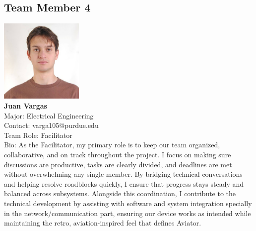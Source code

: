 \subsection{Team Member 4}
\includegraphics[height=4cm]{images/juan.png} \\
\textbf{Juan Vargas}\\
Major: Electrical Engineering\\
Contact: varga105@purdue.edu\\
Team Role: Facilitator \\
Bio: As the Facilitator, my primary role is to keep our team
organized, collaborative, and on track throughout the project.
I focus on making sure discussions are productive, tasks are
clearly divided, and deadlines are met without overwhelming
any single member. By bridging technical conversations and
helping resolve roadblocks quickly, I ensure that progress
stays steady and balanced across subsystems. Alongside this
coordination, I contribute to the technical development by
assisting with software and system integration specially in
the network/communication part, ensuring our device works as
intended while maintaining the retro, aviation-inspired feel
that defines Aviator.